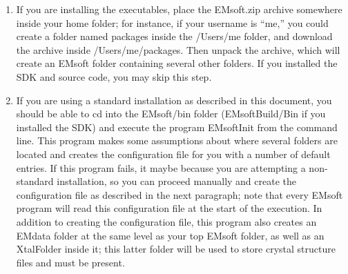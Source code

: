 \documentclass[DIV=calc, paper=letter, fontsize=11pt]{scrartcl}	 %
\begin{document}
\begin{enumerate}
\item If you are installing the executables, place the \textsf{EMsoft.zip} archive somewhere inside your home folder; for instance, if your username is ``me,'' you could create 
a folder named \textsf{packages} inside the \textsf{/Users/me} folder, and download the archive inside \textsf{/Users/me/packages}.
Then unpack the archive, which will create an \textsf{EMsoft} folder containing several other folders.  If you installed the SDK and source code,
you may skip this step.

\item If you are using a standard installation as described in this document, you should be able
to cd into the \textsf{EMsoft/bin} folder (\textsf{EMsoftBuild/Bin} if you installed the SDK) and execute the program \textsf{EMsoftInit} from the command line.
This program makes some assumptions about where several folders are located and creates the configuration file
for you with a number of default entries.  If this program fails, it maybe because you are attempting a non-standard
installation, so you can proceed manually and create the configuration file as described in the next paragraph;
note that every EMsoft program will read this configuration file at the start of the execution.  In addition to creating 
the configuration file, this program also creates an \textsf{EMdata} folder at the same level as your top EMsoft folder,
as well as an \textsf{XtalFolder} inside it; this latter folder will be used to store crystal structure files and must be present.


\end{enumerate}
\end{document}
